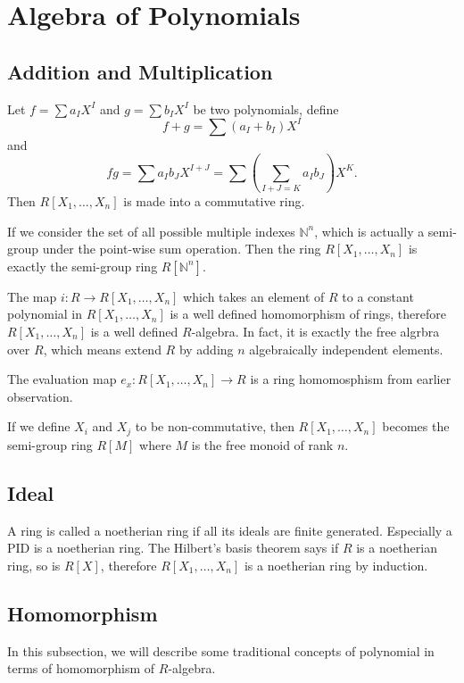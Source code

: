 \documentclass{article}
\begin{document}
\section{Algebra of Polynomials}
\subsection{Addition and Multiplication}
Let $f = \sum a_I X^I$ and $g = \sum b_I X^I$ be two polynomials,
define $$f + g = \sum (a_I + b_I) X^I$$
and $$fg = \sum a_I b_J X^{I+J}= \sum (\sum_{I + J = K} a_I b_J) X^K.$$
Then $R[X_1, \dots, X_n]$ is made into a commutative ring.

If we consider the set of all possible multiple indexes $\mathbb N^n$,
which is actually a semi-group under the point-wise sum operation.
Then the ring $R[X_1, \dots, X_n]$ is exactly the semi-group ring $R[\mathbb N^n]$.

The map $i : R \to R[X_1, \dots, X_n]$ which takes an element of $R$ to a constant polynomial
in $R[X_1, \dots, X_n]$ is a well defined homomorphism of rings,
therefore $R[X_1, \dots, X_n]$ is a well defined $R$-algebra.
In fact, it is exactly the free algrbra over $R$, which means extend $R$ by adding $n$ algebraically
independent elements.

The evaluation map $e_x : R[X_1, \dots, X_n] \to R$ is a ring homomosphism from earlier observation.

If we define $X_i$ and $X_j$ to be non-commutative, then $R[X_1, \dots, X_n]$ becomes the
semi-group ring $R[M]$ where $M$ is the free monoid of rank $n$.

\subsection{Ideal}
A ring is called a noetherian ring if all its ideals are finite generated.
Especially a PID is a noetherian ring.
The Hilbert's basis theorem says if $R$ is a noetherian ring, so is $R[X]$,
therefore $R[X_1, \dots, X_n]$ is a noetherian ring by induction.


\subsection{Homomorphism}
In this subsection, we will describe some traditional concepts of polynomial in terms of homomorphism
of $R$-algebra.
\end{document}
